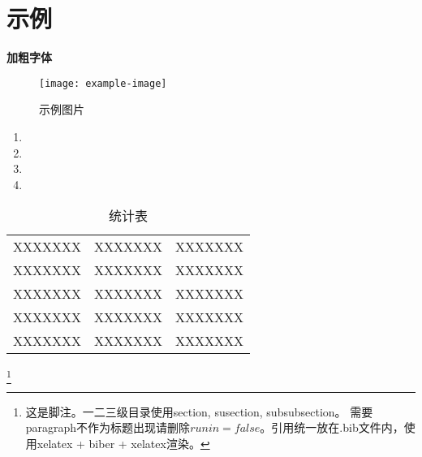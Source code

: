 \documentclass[a4paper,12pt]{article}
\let\songti\relax
\renewcommand{\cfttoctitlefont}{\songti\bfseries\zihao{4}}  %
\begin{document}
\setcounter{page}{1}  %

\newpage          %
\clearpage        %

\renewcommand{\contentsname}{目录}
\renewcommand{\cfttoctitlefont}{\hfill\Large\bfseries}
\renewcommand{\cftaftertoctitle}{\hfill}

\makeatletter
\renewcommand{\@seccntformat}[1]{}  %
\renewcommand{\numberline}[1]{}     %
\makeatother

\renewcommand{\cftsecleader}{\cftdotfill{\cftdotsep}}
\renewcommand{\cftsubsecleader}{\cftdotfill{\cftdotsep}}

\tableofcontents

\thispagestyle{empty}%

\newpage          %
\clearpage        %

\section{示例}

\textbf{加粗字体}

\begin{figure}[H]
    \centering
    \texttt{[image: example-image]}  %
    \caption{示例图片}
    \label{fig:example}
\end{figure}

\begin{enumerate}
  \item 
  \item 
  \item 
  \item  
\end{enumerate}

\setlength{\tabcolsep}{0.5em}
\begin{table}[htbp]
    \centering
    \renewcommand{\arraystretch}{1.5}
    \begin{tabulary}{\textwidth}{|>{\raggedright\arraybackslash}m{0.28\textwidth}|>{\centering\arraybackslash}m{0.12\textwidth}|>{\raggedright\arraybackslash}m{0.5\textwidth}|}
    \hline
     &
     & 
     \\
    \hline
    XXXXXXX & XXXXXXX & XXXXXXX \\
    \hline
    XXXXXXX & XXXXXXX & XXXXXXX \\
    \hline
    XXXXXXX & XXXXXXX & XXXXXXX \\
    \hline
    XXXXXXX & XXXXXXX & XXXXXXX \\
    \hline
    XXXXXXX & XXXXXXX & XXXXXXX \\
    \hline
    \end{tabulary}
    \caption{统计表}
    \label{表1：统计表}
\end{table}

\footnote{这是脚注。一二三级目录使用section, susection, subsubsection。 需要paragraph不作为标题出现请删除$runin = false$。引用统一放在.bib文件内，使用xelatex + biber + xelatex渲染。}
\end{document}

